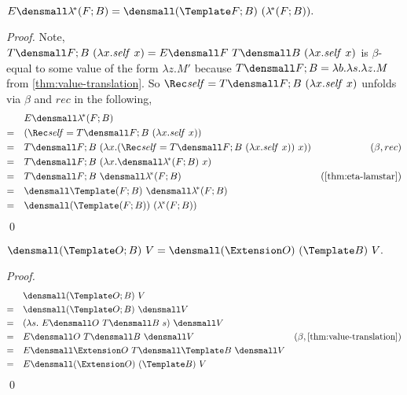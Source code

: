 \begin{lemma}
  \label{thm:unfold-lamstar}
    $ E\den{ \lamstar (F; B)} = \den{(\Template F; B) ~ (\lamstar (F; B))}.$
\end{lemma}
\begin{proof}
  Note,
  \begin{math}
    T\den{F; B} ~ (\lambda x. \mathit{self} ~ x)
    =
    E\den{F} ~ T\den{B} ~ (\lambda x. \mathit{self} ~ x)    
  \end{math}
  is $\beta$-equal to some value of the form $\lambda z. M'$ because
  $T\den{F; B} = \lambda b. \lambda s. \lambda z. M$ from
  \cref{thm:value-translation}.  So
  $\Rec \mathit{self} = T\den{F; B} ~ (\lambda x. \mathit{self} ~ x)$ unfolds
  via $\beta$ and $rec$ in the following,
  \begin{align*}
    &\quad
    E\den{ \lamstar (F; B)}
    \\
    =& \quad
    (\Rec \mathit{self} = T\den{F; B} ~ (\lambda x. \mathit{self} ~ x))
    \\
    =& \quad
    T\den{F; B}
    ~
    (\lambda x.
    (\Rec \mathit{self} = T\den{F; B} ~ (\lambda x. \mathit{self} ~ x))
    ~ x)
    )
    & (\beta, rec)
    \\
    =& \quad
    T\den{F; B} ~ (\lambda x. \den{\lamstar(F; B)} ~ x)
    \\
    =& \quad
    T\den{F; B} ~ \den{\lamstar(F; B)}
    & (\cref{thm:eta-lamstar})
    \\
    =& \quad
    \den{\Template (F; B)} ~ \den{\lamstar (F; B)}
    \\
    =& \quad
    \den{(\Template (F; B)) ~ (\lamstar (F; B))}
  \end{align*}
  \qed
\end{proof}

\begin{lemma}
  \label{thm:templ-ext}

  $ \den{(\Template O; B) ~ V} = \den{(\Extension O) ~ (\Template B) ~ V}.$
\end{lemma}
\begin{proof}
  \begin{align*}
    &\quad \den{(\Template O; B) ~ V} \\
    =& \quad \den{(\Template O; B)} ~ \den{V} \\
    =& \quad (\lambda s. ~E\den{O} ~T\den{B} ~s) ~ \den{V} \\
    =& \quad E\den{O} ~T\den{B} ~ \den{V} & (\beta, \cref{thm:value-translation}) \\
    =& \quad E\den{\Extension O} ~T\den{\Template B} ~ \den{V} \\
    =& \quad E\den{(\Extension O) ~ (\Template B) ~ V}
  \end{align*}
  \qed
\end{proof}

